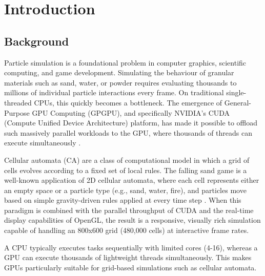 \documentclass[12pt,a4paper]{article}
\begin{document}
	
	\renewcommand*\contentsname{Table of Contents}
	\tableofcontents
	\newpage
	\newpage
    \listoffigures
    \newpage
    \newpage
    \listoftables
    \newpage

    \section{Introduction}

	\subsection{Background}
	Particle simulation is a foundational problem in computer graphics, scientific computing, and game development. 
    Simulating the behaviour of granular materials such as sand, water, or powder requires evaluating thousands 
    to millions of individual particle interactions every frame. On traditional single-threaded CPUs, this quickly 
    becomes a bottleneck. The emergence of General-Purpose GPU Computing (GPGPU), and specifically NVIDIA's 
    CUDA (Compute Unified Device Architecture) platform, has made it possible to offload such massively parallel 
    workloads to the GPU, where thousands of threads can execute simultaneously \cite{nickolls2008scalable}.

    Cellular automata (CA) are a class of computational model in which a grid of cells evolves according to 
    a fixed set of local rules. The falling sand game is a well-known application of 2D cellular automata, 
    where each cell represents either an empty space or a particle type (e.g., sand, water, fire), and 
    particles move based on simple gravity-driven rules applied at every time step \cite{mcivor2009cellular}. 
    When this paradigm is combined with the parallel throughput of CUDA and the real-time display capabilities 
    of OpenGL, the result is a responsive, visually rich simulation capable of handling an 800x600 grid 
    (480,000 cells) at interactive frame rates. 
    
    A CPU typically executes tasks sequentially with limited cores (4-16), whereas a GPU can execute thousands of lightweight threads simultaneously. This makes GPUs particularly suitable for grid-based simulations such as cellular automata.
\end{document}
